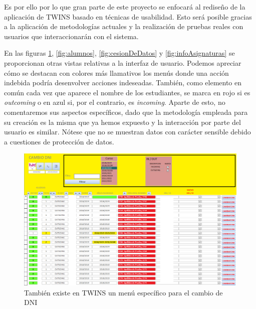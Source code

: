 Es por ello por lo que gran parte de este proyecto se enfocará al rediseño de la aplicación de TWINS basado en técnicas de usabilidad. Esto será posible gracias a la aplicación de metodologías actuales y la realización de pruebas reales con usuarios que interaccionarán con el sistema.

En las figuras \ref{fig:cambioDNI}, \ref{fig:alumnos}, \ref{fig:cesionDeDatos} y \ref{fig:infoAsignaturas} se proporcionan otras vistas relativas a la interfaz de usuario. Podemos apreciar cómo se destacan con colores más llamativos los menús donde una acción indebida podría desenvolver acciones indeseadas. También, como elemento en común cada vez que aparece el nombre de los estudiantes, se marca en rojo si es \textit{outcoming} o en azul si, por el contrario, es \textit{incoming}. Aparte de esto, no comentaremos sus aspectos específicos, dado que la metodología empleada para su creación es la misma que ya hemos expuesto y la interacción por parte del usuario es similar. Nótese que no se muestran datos con carácter sensible debido a cuestiones de protección de datos.


\begin{figure}
	\includegraphics[width=\textwidth]{img/Capturas de TWINS/cambioDNI.png}
	\caption[Menú de cambio de DNI]{También existe en TWINS un menú específico para el cambio de DNI}
	\label{fig:cambioDNI}
\end{figure}

